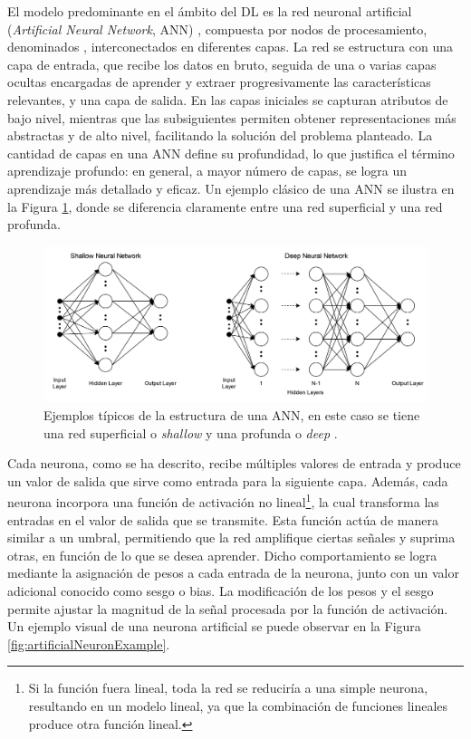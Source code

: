 El modelo predominante en el ámbito del DL es la red neuronal artificial (\textit{Artificial Neural Network}, ANN) \cite{bishop_ANN, ripley_ANN}, compuesta por nodos de procesamiento, denominados , interconectados en diferentes capas. La red se estructura con una capa de entrada, que recibe los datos en bruto, seguida de una o varias capas ocultas encargadas de aprender y extraer progresivamente las características relevantes, y una capa de salida. En las capas iniciales se capturan atributos de bajo nivel, mientras que las subsiguientes permiten obtener representaciones más abstractas y de alto nivel, facilitando la solución del problema planteado. La cantidad de capas en una ANN define su profundidad, lo que justifica el término aprendizaje profundo: en general, a mayor número de capas, se logra un aprendizaje más detallado y eficaz. Un ejemplo clásico de una ANN se ilustra en la Figura \ref{fig:annExample}, donde se diferencia claramente entre una red superficial y una red profunda.

\begin{figure}[h]
    \centering
    \includegraphics[width=\linewidth]{figures/2_theory/neuralNetDiagram.png}
    \caption[Ejemplos de la estructura de una ANN]{Ejemplos típicos de la estructura de una ANN, en este caso se tiene una red superficial o \textit{shallow} y una profunda o \textit{deep} \cite{annPictureSource}.}
    \label{fig:annExample}
\end{figure}

Cada neurona, como se ha descrito, recibe múltiples valores de entrada y produce un valor de salida que sirve como entrada para la siguiente capa. Además, cada neurona incorpora una función de activación no lineal\footnote{Si la función fuera lineal, toda la red se reduciría a una simple neurona, resultando en un modelo lineal, ya que la combinación de funciones lineales produce otra función lineal.}, la cual transforma las entradas en el valor de salida que se transmite. Esta función actúa de manera similar a un umbral, permitiendo que la red amplifique ciertas señales y suprima otras, en función de lo que se desea aprender. Dicho comportamiento se logra mediante la asignación de pesos a cada entrada de la neurona, junto con un valor adicional conocido como sesgo o bias. La modificación de los pesos y el sesgo permite ajustar la magnitud de la señal procesada por la función de activación. Un ejemplo visual de una neurona artificial se puede observar en la Figura \ref{fig:artificialNeuronExample}.


